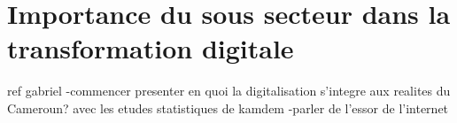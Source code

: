 \section{Importance du sous secteur dans la transformation digitale}
ref gabriel
-commencer presenter en quoi la digitalisation s'integre aux realites du Cameroun?
avec les etudes statistiques de kamdem
-parler de l'essor de l'internet
